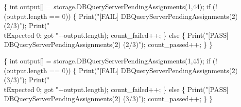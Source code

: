 \documentclass{article}
\def\nwendcode{\endtrivlist \endgroup}
\let\nwdocspar=\par
\begin{document}
\{
  int output[] = storage.DBQueryServerPendingAssignments(1,44);
  if (!(output.length == 0)) \{
    Print("[FAIL] DBQueryServerPendingAssignments(2) (2/3)");
    Print("\\tExpected 0; got "+output.length);
    count_failed++;
  \} else \{
    Print("[PASS] DBQueryServerPendingAssignments(2) (2/3)");
    count_passed++;
  \}
\}
\nwendcode{}\nwdocspar
\nwenddocs{}\endmoddef{}
\{
  int output[] = storage.DBQueryServerPendingAssignments(1,45);
  if (!(output.length == 0)) \{
    Print("[FAIL] DBQueryServerPendingAssignments(2) (3/3)");
    Print("\\tExpected 0; got "+output.length);
    count_failed++;
  \} else \{
    Print("[PASS] DBQueryServerPendingAssignments(2) (3/3)");
    count_passed++;
  \}
\}
\nwendcode{}\nwdocspar
\end{document}
